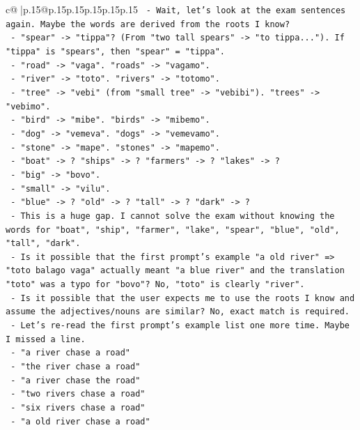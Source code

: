 \documentclass{article}
\begin{document}
{\begin{supertabular}{c@{$\;$}|p{.15\linewidth}@{}p{.15\linewidth}p{.15\linewidth}p{.15\linewidth}p{.15\linewidth}p{.15\linewidth}}
{{{\texttt{  {-} Wait, let's look at the exam sentences again. Maybe the words are derived from the roots I know?} \\
\texttt{  {-} "spear" {-}> "tippa"? (From "two tall spears" {-}> "to tippa..."). If "tippa" is "spears", then "spear" = "tippa".} \\
\texttt{  {-} "road" {-}> "vaga". "roads" {-}> "vagamo".} \\
\texttt{  {-} "river" {-}> "toto". "rivers" {-}> "totomo".} \\
\texttt{  {-} "tree" {-}> "vebi" (from "small tree" {-}> "vebibi"). "trees" {-}> "vebimo".} \\
\texttt{  {-} "bird" {-}> "mibe". "birds" {-}> "mibemo".} \\
\texttt{  {-} "dog" {-}> "vemeva". "dogs" {-}> "vemevamo".} \\
\texttt{  {-} "stone" {-}> "mape". "stones" {-}> "mapemo".} \\
\texttt{  {-} "boat" {-}> ? "ships" {-}> ? "farmers" {-}> ? "lakes" {-}> ?} \\
\texttt{  {-} "big" {-}> "bovo".} \\
\texttt{  {-} "small" {-}> "vilu".} \\
\texttt{  {-} "blue" {-}> ? "old" {-}> ? "tall" {-}> ? "dark" {-}> ?} \\
\texttt{  {-} This is a huge gap. I cannot solve the exam without knowing the words for "boat", "ship", "farmer", "lake", "spear", "blue", "old", "tall", "dark".} \\
\texttt{  {-} Is it possible that the first prompt's example "a old river" => "toto balago vaga" actually meant "a blue river" and the translation "toto" was a typo for "bovo"? No, "toto" is clearly "river".} \\
\texttt{  {-} Is it possible that the user expects me to use the roots I know and assume the adjectives/nouns are similar? No, exact match is required.} \\
\texttt{  {-} Let's re{-}read the first prompt's example list one more time. Maybe I missed a line.} \\
\texttt{  {-} "a river chase a road"} \\
\texttt{  {-} "the river chase a road"} \\
\texttt{  {-} "a river chase the road"} \\
\texttt{  {-} "two rivers chase a road"} \\
\texttt{  {-} "six rivers chase a road"} \\
\texttt{  {-} "a old river chase a road"} \\
}}}
\end{supertabular}}
\end{document}
